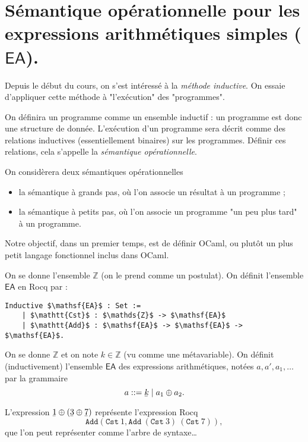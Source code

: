 \documentclass[../main]{subfiles}
\begin{document}
  \chapter{Sémantique opérationnelle pour les expressions arithmétiques simples ($\mathsf{EA}$).}
  \minitoc

  Depuis le début du cours, on s'est intéressé à la \textit{méthode inductive}.
  On essaie d'appliquer cette méthode à "l'exécution" des "programmes".

  On définira un programme comme un ensemble inductif : un programme est donc une structure de donnée.
  L'exécution d'un programme sera décrit comme des relations inductives (essentiellement binaires) sur les programmes.
  Définir ces relations, cela s'appelle la \textit{sémantique opérationnelle}.

  On considèrera deux sémantiques opérationnelles
  \begin{itemize}
    \item la sémantique à grands pas, où l'on associe un résultat à un programme ;
    \item la sémantique à petits pas, où l'on associe un programme "un peu plus tard" à un programme.
  \end{itemize}

  Notre objectif, dans un premier temps, est de définir OCaml, ou plutôt un plus petit langage fonctionnel inclus dans OCaml.

  On se donne l'ensemble $\mathds{Z}$ (on le prend comme un postulat).
  On définit l'ensemble $\mathsf{EA}$ en Rocq par :
  \begin{lstlisting}[language=coq,caption=Définition des expressions arithmétiques simples]
    Inductive $\mathsf{EA}$ : Set :=
    | $\mathtt{Cst}$ : $\mathds{Z}$ -> $\mathsf{EA}$
    | $\mathtt{Add}$ : $\mathsf{EA}$ -> $\mathsf{EA}$ -> $\mathsf{EA}$.
  \end{lstlisting}

  \begin{note}
    On se donne $\mathds{Z}$ et on note $k \in \mathds{Z}$ (vu comme une métavariable).
    On définit (inductivement) l'ensemble $\mathsf{EA}$ des expressions arithmétiques, notées $a, a', a_1, \ldots$ par la grammaire
    \[
      a ::= \ubar{k}  \mid a_1 \oplus a_2
    .\] 
  \end{note}

  \begin{exm}
    L'expression $\ubar 1 \oplus (\ubar 3 \oplus \ubar 7)$ représente l'expression Rocq 
    \[
    \mathtt{Add}(\mathtt{Cst}\ 1, \mathtt{Add}\ (\mathtt{Cst}\ 3)\ (\mathtt{Cst}\ 7))
    ,\]
    que l'on peut représenter comme l'arbre de syntaxe\ldots
  \end{exm}
\end{document}
